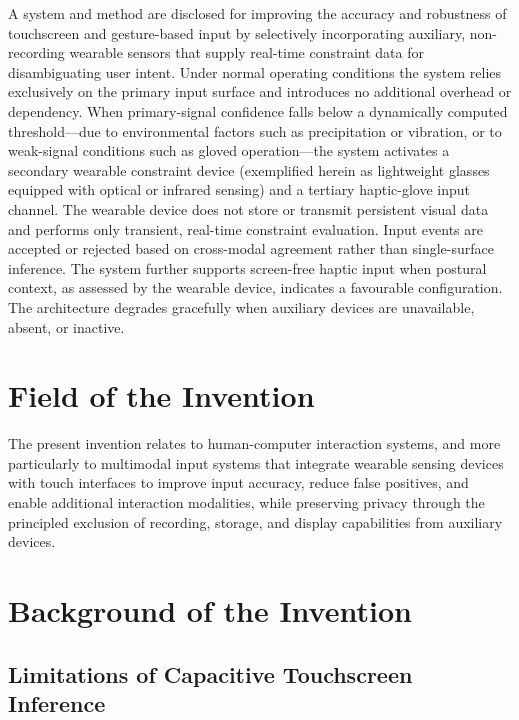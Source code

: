 \documentclass[11pt,letterpaper]{article}
\begin{document}
A system and method are disclosed for improving the accuracy and robustness of
touchscreen and gesture-based input by selectively incorporating auxiliary,
non-recording wearable sensors that supply real-time constraint data for
disambiguating user intent. Under normal operating conditions the system relies
exclusively on the primary input surface and introduces no additional overhead or
dependency. When primary-signal confidence falls below a dynamically computed
threshold---due to environmental factors such as precipitation or vibration, or to
weak-signal conditions such as gloved operation---the system activates a secondary
wearable constraint device (exemplified herein as lightweight glasses equipped with
optical or infrared sensing) and a tertiary haptic-glove input channel. The wearable
device does not store or transmit persistent visual data and performs only transient,
real-time constraint evaluation. Input events are accepted or rejected based on
cross-modal agreement rather than single-surface inference. The system further
supports screen-free haptic input when postural context, as assessed by the wearable
device, indicates a favourable configuration. The architecture degrades gracefully
when auxiliary devices are unavailable, absent, or inactive.

\newpage

\section{Field of the Invention}

The present invention relates to human-computer interaction systems, and more
particularly to multimodal input systems that integrate wearable sensing devices with
touch interfaces to improve input accuracy, reduce false positives, and enable
additional interaction modalities, while preserving privacy through the principled
exclusion of recording, storage, and display capabilities from auxiliary devices.

\section{Background of the Invention}

\subsection{Limitations of Capacitive Touchscreen Inference}
\end{document}
